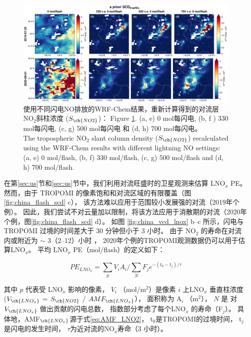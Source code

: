 \begin{figure}[!htbp]
    \includegraphics[width=17cm]{./figures/s5p_apriori_scd.png}
    \caption{使用不同闪电NO排放的WRF-Chem结果，重新计算得到的对流层NO$_2$斜柱浓度 ($S_{\ch{NO2}}$)：
    Figure \ref{fig:s5p_apriori_scd}. (a, e) 0 mol每闪电, (b, f ) 330 mol每闪电, (c, g) 500 mol每闪电 和 (d, h) 700 mol每闪电。\\
    The tropospheric NO$_2$ slant column density ($S_{\ch{NO2}}$) recalculated using the WRF-Chem results with different lightning NO settings: (a, e) 0 mol/flash, (b, f) 330 mol/flash, (c, g) 500 mol/flash and (d, h) 700 mol/flash.
    }
    \label{fig:s5p_apriori_scd}
\end{figure}

在第\ref{sec:us}节和\ref{sec:us}节中，我们利用对流旺盛时的卫星观测来估算 LNO$_x$ PE。
然而，由于 TROPOMI 的像素饱和和对流区域的有限覆盖（图\ref{fig:china_flash_scd} c），
该方法难以应用于范围较小发展强的对流（2019年个例）。
因此，我们尝试不对云量加以限制，将该方法应用于消散期的对流（2020年个例，图\ref{fig:china_flash_scd} d）。
如图 \ref{fig:china_vcd_lnox} b--c 所示，闪电与 TROPOMI 过境的时间差大于 30 分钟但小于 3 小时。
由于 NO$_2$ 的寿命在对流内或附近为 $\sim$ 3（2--12）小时 \citep{Nault.2016}，
2020年个例的TROPOMI观测数据仍可以用于估算LNO$_x$。
平均 LNO$_x$ PE（mol/flash）的定义如下：


\begin{equation} \label{eq:lnox}
PE_{LNO_x} = \sum_{p} V_i A_i / \sum_{N} F_j e^{-(t_0 - t_j) / \tau}
\end{equation}

其中 $p$ 代表受 LNO$_x$ 影响的像素，
$V_i$ （mol/m$^2$）是像素 $i$ 上LNO$_x$ 垂直柱浓度 ($V_{\ch{LNO_x}}$ = $S_{\ch{NO2}}$ / $AMF_{\ch{LNO_x}}$），
面积称为 A$_i$ （m$^2$），
$N$ 是 对 $V_{\ch{LNO_x}}$ 做出贡献的闪电总数，
指数部分考虑了每个LNO$_x$ 的寿命（F$_j$）。
具体地，AMF$_{\ch{LNO_x}}$源于式\ref{eq:AMF_LNO2}，
t$_0$是TROPOMI的过境时间，
t$_j$是闪电的发生时间，
$\tau$为近对流的NO$_x$寿命（3 小时）。

